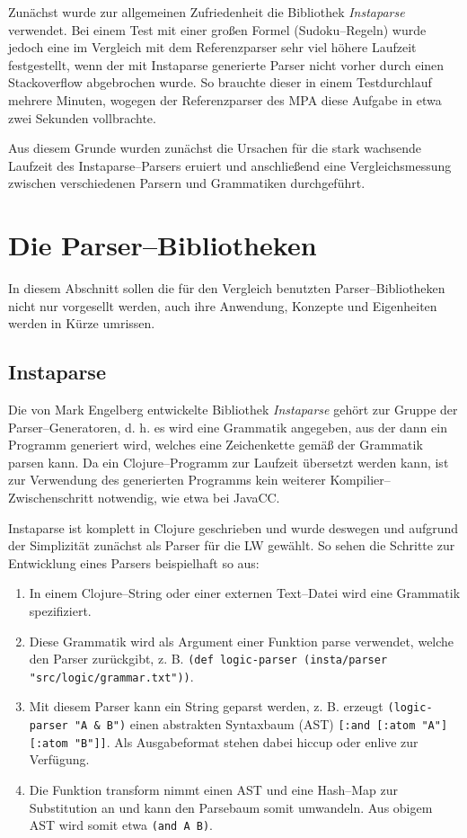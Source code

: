 \documentclass[ngerman,a4paper,abstracton,open=right,twoside=false,toc=listofnumbered,bibtotocnumbered]{scrreprt}
\begin{document}
Zunächst wurde zur allgemeinen Zufriedenheit die Bibliothek \emph{Instaparse} verwendet. Bei einem Test mit einer großen Formel (Sudoku--Regeln) wurde jedoch eine im Vergleich mit dem Referenzparser sehr viel höhere Laufzeit festgestellt, wenn der mit Instaparse generierte Parser nicht vorher durch einen Stackoverflow abgebrochen wurde. So brauchte dieser in einem Testdurchlauf mehrere Minuten, wogegen der Referenzparser des MPA diese Aufgabe in etwa zwei Sekunden vollbrachte.

Aus diesem Grunde wurden zunächst die Ursachen für die stark wachsende Laufzeit des Instaparse--Parsers eruiert und anschließend eine Vergleichsmessung zwischen verschiedenen Parsern und Grammatiken durchgeführt.

\section{Die Parser--Bibliotheken}

In diesem Abschnitt sollen die für den Vergleich benutzten Parser--Bibliotheken nicht nur vorgesellt werden, auch ihre Anwendung, Konzepte und Eigenheiten werden in Kürze umrissen.

\subsection{Instaparse}

Die von Mark Engelberg entwickelte Bibliothek \emph{Instaparse} gehört zur Gruppe der Parser--Generatoren, d. h. es wird eine Grammatik angegeben, aus der dann ein Programm generiert wird, welches eine Zeichenkette gemäß der Grammatik parsen kann. Da ein Clojure--Programm zur Laufzeit übersetzt werden kann, ist zur Verwendung des generierten Programms kein weiterer Kompilier--Zwischenschritt notwendig, wie etwa bei JavaCC. \cite{instaparse}

Instaparse ist komplett in Clojure geschrieben und wurde deswegen und aufgrund der Simplizität zunächst als Parser für die LW gewählt. So sehen die Schritte zur Entwicklung eines Parsers beispielhaft so aus:

\begin{enumerate}
	\item In einem Clojure--String oder einer externen Text--Datei wird eine Grammatik spezifiziert.
	\item Diese Grammatik wird als Argument einer Funktion \glqq{}parse\grqq{} verwendet, welche den Parser zurückgibt, z. B. \lstinline|(def logic-parser (insta/parser "src/logic/grammar.txt"))|.
	\item Mit diesem Parser kann ein String geparst werden, z. B. erzeugt \lstinline|(logic-parser "A & B")| einen abstrakten Syntaxbaum (AST) \lstinline|[:and [:atom "A"] [:atom "B"]]|. Als Ausgabeformat stehen dabei hiccup oder enlive zur Verfügung.
	\item Die Funktion \glqq{}transform\grqq{} nimmt einen AST und eine Hash--Map zur Substitution an und kann den Parsebaum somit umwandeln. Aus obigem AST wird somit etwa \lstinline|(and A B)|.
\end{enumerate}
\end{document}
